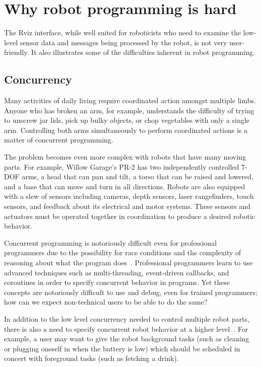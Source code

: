 \documentclass[10pt,twocolumn]{article}
\begin{document}
\section{Why robot programming is hard}

The Rviz interface, while well suited for roboticists who need to examine the low-level sensor data and messages being processed by the robot, is not very user-friendly. It also illustrates some of the difficulties inherent in robot programming.

\subsection{Concurrency}


Many activities of daily living require coordinated action amongst multiple limbs. Anyone who has broken an arm, for example, understands the difficulty of trying to unscrew jar lids, pick up bulky objects, or chop vegetables with only a single arm. Controlling both arms simultaneously to perform coordinated actions is a matter of concurrent programming.

The problem becomes even more complex with robots that have many moving parts.
For example, Willow Garage's PR-2 has two independently controlled 7-DOF arms, a head that can pan and tilt, a torso that can be raised and lowered, and a base that can move and turn in all directions. Robots are also equipped with a slew of sensors including cameras, depth sensors, laser rangefinders, touch sensors, and feedback about its electrical and motor systems. These sensors and actuators must be operated together in coordination to produce a desired robotic behavior.

Concurrent programming is notoriously difficult even for professional programmers due to the possibility for race conditions and the complexity of reasoning about what the program does~\cite{shavit-cacm11}. Professional programmers learn to use advanced techniques such as multi-threading, event-driven callbacks, and coroutines in order to specify concurrent behavior in programs. Yet these concepts are notoriously difficult to use and debug, even for trained programmers; how can we expect non-technical users to be able to do the same?

In addition to the low level concurrency needed to control multiple robot parts, there is also a need to specify concurrent robot behavior at a higher level~\cite{cakmak-hri13}. For example, a user may want to give the robot background tasks (such as cleaning or plugging oneself in when the battery is low) which should be scheduled in concert with foreground tasks (such as fetching a drink).
\end{document}

